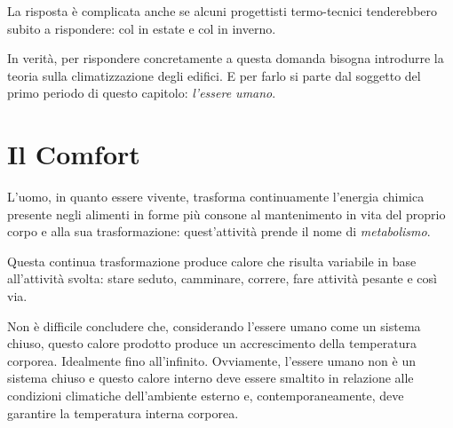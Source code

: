 La risposta è complicata anche se alcuni progettisti termo-tecnici tenderebbero subito a rispondere:  col  in estate e  col  in inverno.

In verità, per rispondere concretamente a questa domanda bisogna introdurre la teoria sulla climatizzazione degli edifici. E per farlo si parte dal soggetto del primo periodo di questo capitolo: \emph{l'essere umano}.

\section{Il Comfort}
L'uomo, in quanto essere vivente, trasforma continuamente l'energia chimica presente negli alimenti in forme più consone al mantenimento in vita del proprio corpo e alla sua trasformazione: quest'attività prende il nome di \emph{metabolismo}.

Questa continua trasformazione produce calore che risulta variabile in base all'attività svolta: stare seduto, camminare, correre, fare attività pesante e così via.

Non è difficile concludere che, considerando l'essere umano come un sistema chiuso, questo calore prodotto produce un accrescimento della temperatura corporea. Idealmente fino all'infinito. Ovviamente, l'essere umano non è un sistema chiuso e questo calore interno deve essere smaltito in relazione alle condizioni climatiche dell'ambiente esterno e, contemporaneamente, deve garantire la temperatura interna corporea.

